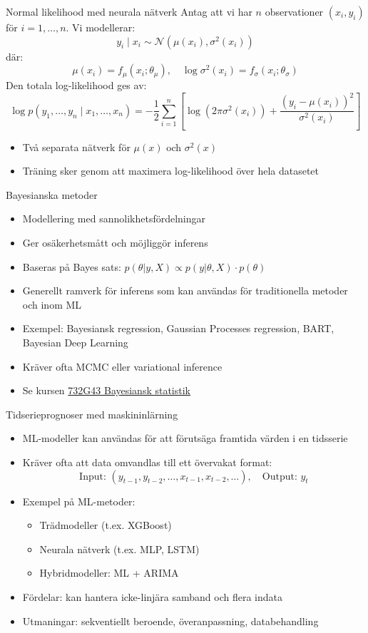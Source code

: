\documentclass[10pt,english]{beamer}
\begin{document}
\begin{frame}{Normal likelihood med neurala nätverk}
  Antag att vi har $n$ observationer $(x_i, y_i)$ för $i = 1, \dots, n$. Vi modellerar:
  \[
  y_i \mid x_i \sim \mathcal{N}(\mu(x_i), \sigma^2(x_i))
  \]
  där:
  \[
  \mu(x_i) = f_\mu(x_i; \theta_\mu), \quad \log \sigma^2(x_i) = f_\sigma(x_i; \theta_\sigma)
  \]
  Den totala log-likelihood ges av:
  \[
  \log p(y_1, \dots, y_n \mid x_1, \dots, x_n) = 
  -\frac{1}{2} \sum_{i=1}^n \left[ \log(2\pi \sigma^2(x_i)) + \frac{(y_i - \mu(x_i))^2}{\sigma^2(x_i)} \right]
  \]
  \begin{itemize}
    \item Två separata nätverk för $\mu(x)$ och $\sigma^2(x)$
    \item Träning sker genom att maximera log-likelihood över hela datasetet
  \end{itemize}
\end{frame}

\begin{frame}{Bayesianska metoder}
  \begin{itemize}
    \item Modellering med sannolikhetsfördelningar
    \item Ger osäkerhetsmått och möjliggör inferens
    \item Baseras på Bayes sats: $p(\theta |y,X) \propto p(y|\theta,X) \cdot p(\theta)$
    \item Generellt ramverk för inferens som kan användas för traditionella metoder och inom ML
    \item Exempel: Bayesiansk regression, Gaussian Processes regression, BART, Bayesian Deep Learning
    \item Kräver ofta MCMC eller variational inference
    \item Se kursen  \href{https://studieinfo.liu.se/kurs/732G43}{732G43 Bayesiansk statistik}
  \end{itemize}
\end{frame}

\begin{frame}{Tidserieprognoser med maskininlärning}
  \begin{itemize}
    \item ML-modeller kan användas för att förutsäga framtida värden i en tidsserie
    \item Kräver ofta att data omvandlas till ett övervakat format:
    \[
    \text{Input: } (y_{t-1}, y_{t-2}, \dots, x_{t-1}, x_{t-2}, \dots), \quad \text{Output: } y_t
    \]
    \item Exempel på ML-metoder:
    \begin{itemize}
      \item Trädmodeller (t.ex. XGBoost)
      \item Neurala nätverk (t.ex. MLP, LSTM)
      \item Hybridmodeller: ML + ARIMA
    \end{itemize}
    \item Fördelar: kan hantera icke-linjära samband och flera indata
    \item Utmaningar: sekventiellt beroende, överanpassning, databehandling
  \end{itemize}
\end{frame}
\end{document}
